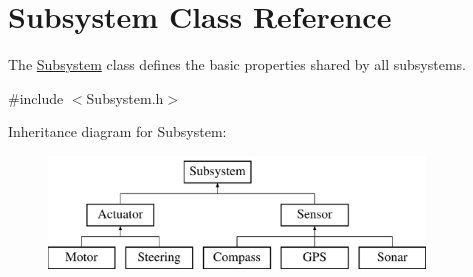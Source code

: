 \hypertarget{classSubsystem}{\section{Subsystem Class Reference}
\label{classSubsystem}
}


The \hyperlink{classSubsystem}{Subsystem} class defines the basic properties shared by all subsystems.  




{\ttfamily \#include $<$Subsystem.\-h$>$}

Inheritance diagram for Subsystem\-:\begin{figure}[H]
\begin{center}
\leavevmode
\includegraphics[height=3.000000cm]{classSubsystem}
\end{center}
\end{figure}
